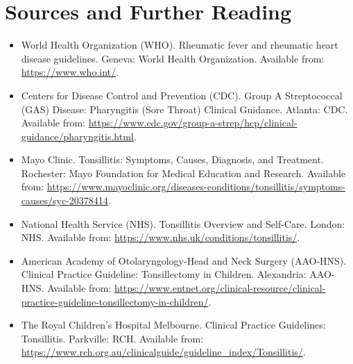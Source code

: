 \section*{Sources and Further Reading}
\begin{itemize}
    \item World Health Organization (WHO). Rheumatic fever and rheumatic heart disease guidelines. Geneva: World Health Organization. Available from: \href{https://www.who.int/}{https://www.who.int/}.
    \item Centers for Disease Control and Prevention (CDC). Group A Streptococcal (GAS) Disease: Pharyngitis (Sore Throat) Clinical Guidance. Atlanta: CDC. Available from: \href{https://www.cdc.gov/group-a-strep/hcp/clinical-guidance/pharyngitis.html}{https://www.cdc.gov/group-a-strep/hcp/clinical-guidance/pharyngitis.html}.
    \item Mayo Clinic. Tonsillitis: Symptoms, Causes, Diagnosis, and Treatment. Rochester: Mayo Foundation for Medical Education and Research. Available from: \href{https://www.mayoclinic.org/diseases-conditions/tonsillitis/symptoms-causes/syc-20378414}{https://www.mayoclinic.org/diseases-conditions/tonsillitis/symptoms-causes/syc-20378414}.
    \item National Health Service (NHS). Tonsillitis Overview and Self-Care. London: NHS. Available from: \href{https://www.nhs.uk/conditions/tonsillitis/}{https://www.nhs.uk/conditions/tonsillitis/}.
    \item American Academy of Otolaryngology-Head and Neck Surgery (AAO-HNS). Clinical Practice Guideline: Tonsillectomy in Children. Alexandria: AAO-HNS. Available from: \href{https://www.entnet.org/clinical-resource/clinical-practice-guideline-tonsillectomy-in-children/}{https://www.entnet.org/clinical-resource/clinical-practice-guideline-tonsillectomy-in-children/}.
    \item The Royal Children's Hospital Melbourne. Clinical Practice Guidelines: Tonsillitis. Parkville: RCH. Available from: \href{https://www.rch.org.au/clinicalguide/guideline\_index/Tonsillitis/}{https://www.rch.org.au/clinicalguide/guideline\_index/Tonsillitis/}.
\end{itemize}
